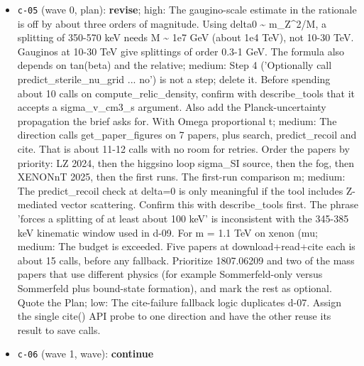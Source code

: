 \documentclass[11pt,a4paper]{article}
\begin{document}
\begin{itemize}
  \item \texttt{c-05} (wave 0, plan): \textbf{revise}; high: The gaugino-scale estimate in the rationale is off by about three orders of magnitude. Using delta0 \textasciitilde{} m\_Z\textasciicircum{}2/M, a splitting of 350-570 keV needs M \textasciitilde{} 1e7 GeV (about 1e4 TeV), not 10-30 TeV. Gauginos at 10-30 TeV give splittings of order 0.3-1 GeV. The formula also depends on tan(beta) and the relative; medium: Step 4 ('Optionally call predict\_sterile\_nu\_grid ... no') is not a step; delete it. Before spending about 10 calls on compute\_relic\_density, confirm with describe\_tools that it accepts a sigma\_v\_cm3\_s argument. Also add the Planck-uncertainty propagation the brief asks for. With Omega proportional t; medium: The direction calls get\_paper\_figures on 7 papers, plus search, predict\_recoil and cite. That is about 11-12 calls with no room for retries. Order the papers by priority: LZ 2024, then the higgsino loop sigma\_SI source, then the fog, then XENONnT 2025, then the first runs. The first-run comparison m; medium: The predict\_recoil check at delta=0 is only meaningful if the tool includes Z-mediated vector scattering. Confirm this with describe\_tools first. The phrase 'forces a splitting of at least about 100 keV' is inconsistent with the 345-385 keV kinematic window used in d-09. For m = 1.1 TeV on xenon (mu; medium: The budget is exceeded. Five papers at download+read+cite each is about 15 calls, before any fallback. Prioritize 1807.06209 and two of the mass papers that use different physics (for example Sommerfeld-only versus Sommerfeld plus bound-state formation), and mark the rest as optional. Quote the Plan; low: The cite-failure fallback logic duplicates d-07. Assign the single cite() API probe to one direction and have the other reuse its result to save calls.
  \item \texttt{c-06} (wave 1, wave): \textbf{continue}

\end{itemize}
\end{document}
